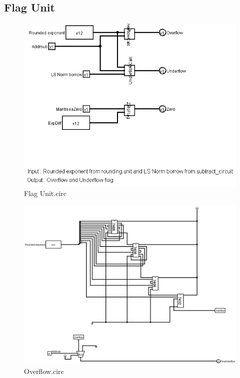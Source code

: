 \documentclass[18pt]{article}
\begin{document}
\subsection{Flag Unit}
\begin{figure}[!h]
    \centering
    \captionsetup{font=Large}
    \includegraphics[scale=0.5]{Util/FlagUnit.png}
    \caption{Flag Unit.circ}
\end{figure}
\begin{figure}[!h]
    \centering
    \captionsetup{font=Large}
    \includegraphics[scale=0.3]{Util/Overflow.png}
    \caption{Overflow.circ}
\end{figure}
\end{document}
